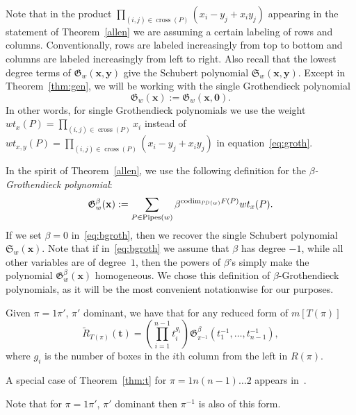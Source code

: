\documentclass[ALCO,ThmDefs]{cedram}
\numberwithin{equation}{section}
\DeclareMathOperator{\Pipes}{Pipes}
\DeclareMathOperator{\cross}{cross}
\newcommand*\+{\smash{\lower2pt\hbox{\rlap{\vrule height14pt}}\raise2pt\hbox{\rlap{\hskip-3pt \vrule height.4pt depth0pt width14.7pt}}}}
\newcommand*{\MK}{\mkern 2mu}
\DeclareMathOperator{\PD}{\textit{PD}\MK}
\begin{document}
Note that in the product $\prod_{(i,j) \in \cross(P)} (x_i-y_j+x_iy_j)$ appearing in the statement of Theorem~\ref{allen} we are assuming a certain labeling of rows and columns. Conventionally, rows are labeled increasingly from top to bottom and columns are labeled increasingly from left to right. Also recall that the lowest degree terms of $\mathfrak{G}_w(\mathbf{x, y})$ give the Schubert polynomial $\mathfrak{S}_w(\mathbf{x, y})$. Except in Theorem~\ref{thm:gen}, we will be working with the single Grothendieck polynomial
\[
\mathfrak{G}_w(\mathbf{x}):=\mathfrak{G}_w(\mathbf{x, 0}).
\]
In other words, for single Grothendieck polynomials we use the weight $wt_{x}(P)=\prod_{(i,j) \in \cross(P)} x_i$ instead of $wt_{x,y}(P)=\prod_{(i,j) \in \cross(P)} (x_i-y_j+x_iy_j)$ in equation~\eqref{eq:groth}.


In the spirit of Theorem~\ref{allen}, we use the following definition for the \emph{$\beta$-Grothendieck polynomial}:
\begin{equation}
\mathfrak{G}^{\beta}_w(\mathbf{x}):=\sum_{P\in \Pipes(w)}\beta^{\mathrm{codim}_{\PD(w)}F(P)} wt_{x}(P).\label{eq:bgroth}
\end{equation}
If we set $\beta=0$ in~\eqref{eq:bgroth}, then we recover the single Schubert polynomial $\mathfrak{S}_w(\mathbf{x})$. Note that if in~\eqref{eq:bgroth} we assume that $\beta$ has degree $-1$, while all other variables are of degree~$1$, then the powers of $\beta$'s simply make the polynomial $ \mathfrak{G}_w^{\beta}(\mathbf{x})$ homogeneous. We chose this definition of $\beta$-Grothendieck polynomials, as it will be the most convenient notationwise for our purposes.

\begin{theo}\label{thm:t}
Given $\pi=1\pi'$, $\pi'$ dominant, we have that for any reduced form of $m[T(\pi)]$
\begin{equation}
\tilde{R}_{T(\pi)}(\mathbf{t})=\left(\prod_{i=1}^{n-1} t_i^{g_i}\right) \mathfrak{G}_{{\pi}^{-1}}^{\beta}(t_1^{-1}, \dots, t_{n-1}^{-1}),
\end{equation}
where $g_i$ is the number of boxes in the $i$th column from the left in $R(\pi)$.
\end{theo}

A special case of Theorem~\ref{thm:t} for $\pi=1n(n-1)\dots 2$ appears in~\cite{k2014}.

Note that for $\pi=1\pi'$, $\pi'$ dominant then $\pi^{-1}$ is also of this form.
\end{document}
